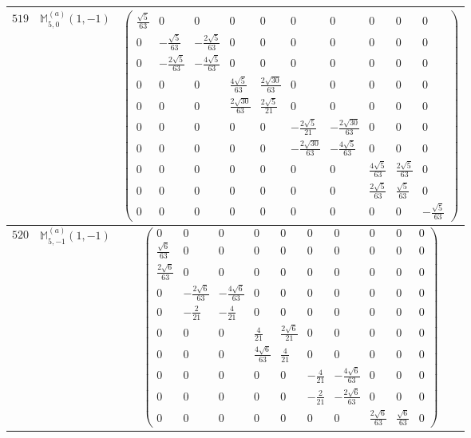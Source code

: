 \documentclass[fleqn,8pt,landscape]{jsarticle}
\begin{document}
\begin{center}
\begin{longtable}{ccc}
$ 519 $ & $ \mathbb{M}_{5,0}^{(a)}(1,-1) $ & $ \begin{pmatrix} \frac{\sqrt{5}}{63} & 0 & 0 & 0 & 0 & 0 & 0 & 0 & 0 & 0 \\ 0 & - \frac{\sqrt{5}}{63} & - \frac{2 \sqrt{5}}{63} & 0 & 0 & 0 & 0 & 0 & 0 & 0 \\ 0 & - \frac{2 \sqrt{5}}{63} & - \frac{4 \sqrt{5}}{63} & 0 & 0 & 0 & 0 & 0 & 0 & 0 \\ 0 & 0 & 0 & \frac{4 \sqrt{5}}{63} & \frac{2 \sqrt{30}}{63} & 0 & 0 & 0 & 0 & 0 \\ 0 & 0 & 0 & \frac{2 \sqrt{30}}{63} & \frac{2 \sqrt{5}}{21} & 0 & 0 & 0 & 0 & 0 \\ 0 & 0 & 0 & 0 & 0 & - \frac{2 \sqrt{5}}{21} & - \frac{2 \sqrt{30}}{63} & 0 & 0 & 0 \\ 0 & 0 & 0 & 0 & 0 & - \frac{2 \sqrt{30}}{63} & - \frac{4 \sqrt{5}}{63} & 0 & 0 & 0 \\ 0 & 0 & 0 & 0 & 0 & 0 & 0 & \frac{4 \sqrt{5}}{63} & \frac{2 \sqrt{5}}{63} & 0 \\ 0 & 0 & 0 & 0 & 0 & 0 & 0 & \frac{2 \sqrt{5}}{63} & \frac{\sqrt{5}}{63} & 0 \\ 0 & 0 & 0 & 0 & 0 & 0 & 0 & 0 & 0 & - \frac{\sqrt{5}}{63} \end{pmatrix} $ \\ \hline
$ 520 $ & $ \mathbb{M}_{5,-1}^{(a)}(1,-1) $ & $ \begin{pmatrix} 0 & 0 & 0 & 0 & 0 & 0 & 0 & 0 & 0 & 0 \\ \frac{\sqrt{6}}{63} & 0 & 0 & 0 & 0 & 0 & 0 & 0 & 0 & 0 \\ \frac{2 \sqrt{6}}{63} & 0 & 0 & 0 & 0 & 0 & 0 & 0 & 0 & 0 \\ 0 & - \frac{2 \sqrt{6}}{63} & - \frac{4 \sqrt{6}}{63} & 0 & 0 & 0 & 0 & 0 & 0 & 0 \\ 0 & - \frac{2}{21} & - \frac{4}{21} & 0 & 0 & 0 & 0 & 0 & 0 & 0 \\ 0 & 0 & 0 & \frac{4}{21} & \frac{2 \sqrt{6}}{21} & 0 & 0 & 0 & 0 & 0 \\ 0 & 0 & 0 & \frac{4 \sqrt{6}}{63} & \frac{4}{21} & 0 & 0 & 0 & 0 & 0 \\ 0 & 0 & 0 & 0 & 0 & - \frac{4}{21} & - \frac{4 \sqrt{6}}{63} & 0 & 0 & 0 \\ 0 & 0 & 0 & 0 & 0 & - \frac{2}{21} & - \frac{2 \sqrt{6}}{63} & 0 & 0 & 0 \\ 0 & 0 & 0 & 0 & 0 & 0 & 0 & \frac{2 \sqrt{6}}{63} & \frac{\sqrt{6}}{63} & 0 \end{pmatrix} $ \\ \hline

\end{longtable}
\end{center}
\end{document}
